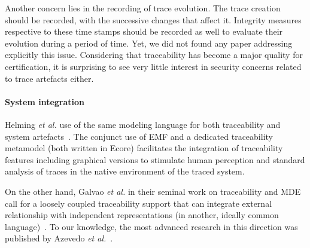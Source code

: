 Another concern lies in the recording of trace evolution. The trace creation should be recorded, with the successive changes that affect it. Integrity measures respective to these time stamps should be recorded as well to evaluate their evolution during a period of time. Yet, we did not found any paper addressing explicitly this issue.
Considering that traceability has become a major quality for certification, it is surprising to see very little interest in security concerns related to trace artefacts either.


\paragraph{System integration} 
Helming \textit{et al.} use of the same modeling language for both traceability and system artefacts~\cite{helming2009-traceability-change-awareness}. The conjunct use of EMF and a dedicated traceability metamodel (both written in Ecore) facilitates the integration of traceability features including graphical versions to stimulate human perception and standard analysis of traces in the native environment of the traced system. 

On the other hand, Galvao \textit{et al.} in their seminal work on traceability and MDE call for a loosely coupled traceability support that can integrate external relationship with independent representations (in another, ideally common language)~\cite{galvao2007-survey-traceability-in-MDE}. To our knowledge, the most advanced research in this direction was published by Azevedo \textit{et al.}~\cite{azevedo2019-traceability-metamodel-and-reference-model}. 


